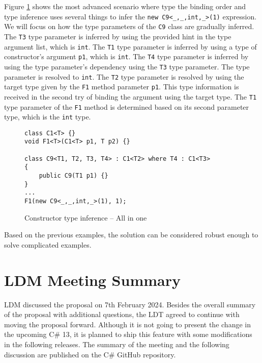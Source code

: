 \newpage

\par
Figure \ref{img79:example7} shows the most advanced scenario where type the binding order and type inference uses several things to infer the \texttt{new C9<\_,\_,int,\_>(1)} expression. 
We will focus on how the type parameters of the \texttt{C9} class are gradually inferred. 
The \texttt{T3} type parameter is inferred by using the provided hint in the type argument list, which is \texttt{int}. 
The \texttt{T1} type parameter is inferred by using a type of constructor’s argument \texttt{p1}, which is \texttt{int}.
The \texttt{T4} type parameter is inferred by using the type parameter’s dependency using the \texttt{T3} type parameter. 
The type parameter is resolved to \texttt{int}. 
The \texttt{T2} type parameter is resolved by using the target type given by the \texttt{F1} method parameter \texttt{p1}. 
This type information is received in the second try of binding the argument using the target type. 
The \texttt{T1} type parameter of the \texttt{F1} method is determined based on its second parameter type, which is the \texttt{int} type.
\begin{figure}[!h]
\begin{lstlisting}[style=csharp, showstringspaces=false]
class C1<T> {}
void F1<T>(C1<T> p1, T p2) {}

class C9<T1, T2, T3, T4> : C1<T2> where T4 : C1<T3>
{
    public C9(T1 p1) {}
}
...
F1(new C9<_,_,int,_>(1), 1);
\end{lstlisting}
\caption{Constructor type inference -- All in one}
\label{img79:example7}
\end{figure}
\par
Based on the previous examples, the solution can be considered robust enough to solve complicated examples.

\newpage

\section{LDM Meeting Summary}

LDM discussed the proposal on 7th February 2024. 
Besides the overall summary of the proposal with additional questions, the LDT agreed to continue with moving the proposal forward. 
Although it is not going to present the change in the upcoming C\# 13, it is planned to ship this feature with some modifications in the following releases. 
The summary \cite{online:mettingSummary} of the meeting and the following discussion \cite{online:mettingSummaryDisc} are published on the C\# GitHub repository.